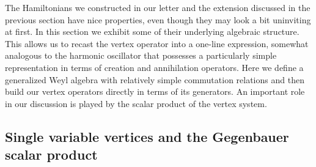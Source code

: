 \documentclass{article}
\begin{document}
The Hamiltonians we constructed in our letter \cite{Buric:2020dyz} and the extension discussed 
in the previous section have nice properties, even though they may look a bit uninviting at 
first. In this section we exhibit some of their underlying algebraic structure. This allows us to recast the vertex operator into a one-line expression, somewhat analogous to the 
harmonic oscillator that possesses a particularly simple representation in terms of creation 
and annihilation operators. Here we define a generalized Weyl algebra with relatively 
simple commutation relations and then build our vertex operators directly in terms of its 
generators. An important role in our discussion is played by the scalar 
product of the vertex system. 

\subsection{Single variable vertices and the Gegenbauer scalar product} 
\end{document}
